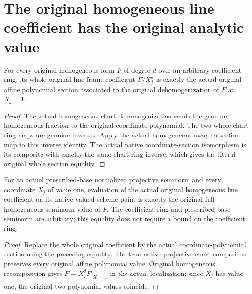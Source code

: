 \section{The original homogeneous line coefficient has the original analytic value}

\begin{lemma}
\label{lem:fc-original-homogeneous-section-coordinate}
\leanok
{}
For every original homogeneous form $F$ of degree $d$ over an arbitrary
coefficient ring, its whole original line-frame coefficient $F/X_j^d$ is
exactly the actual original affine polynomial section associated to the
original dehomogenization of $F$ at $X_j=1$.
\end{lemma}
\begin{proof}
The actual homogeneous-chart dehomogenization sends the genuine homogeneous
fraction to the original coordinate polynomial.  The two whole chart ring
maps are genuine inverses.  Apply the actual homogeneous away-to-section
map to this inverse identity.  The actual native coordinate-section
isomorphism is its composite with exactly the same chart ring inverse,
which gives the literal original whole section equality.
\end{proof}

\begin{lemma}
\label{lem:fc-original-homogeneous-section-value}
\leanok
{}
For an actual prescribed-base normalized projective seminorm and every
coordinate $X_j$ of value one, evaluation of the actual original homogeneous
line coefficient on its native valued scheme point is exactly the original
full homogeneous seminorm value of $F$.  The coefficient ring and prescribed
base seminorm are arbitrary; this equality does not require a bound on the
coefficient ring.
\end{lemma}
\begin{proof}
Replace the whole original coefficient by the actual coordinate-polynomial
section using the preceding equality.  The true native projective chart
comparison preserves every original affine polynomial value.  Original
homogeneous recomposition gives $F=X_j^d F|_{X_j=1}$ in the actual localization;
since $X_j$ has value one, the original two polynomial values coincide.
\end{proof}
